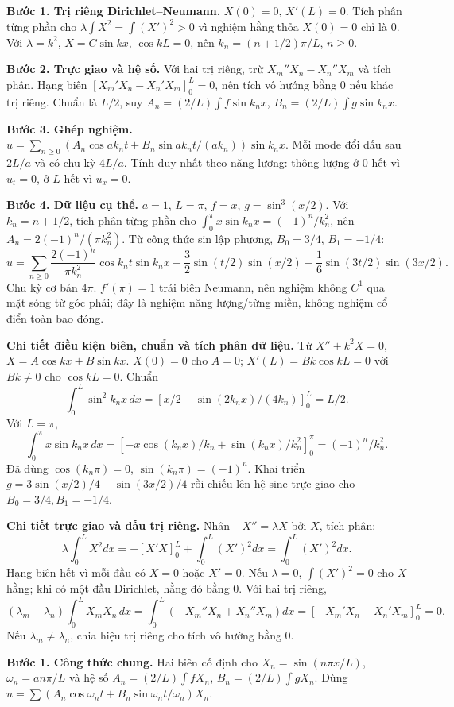 \textbf{Bước 1. Trị riêng Dirichlet–Neumann.} $X(0)=0$, $X'(L)=0$. Tích phân từng phần cho $\lambda\int X^2=\int(X')^2>0$ vì nghiệm hằng thỏa $X(0)=0$ chỉ là $0$. Với $\lambda=k^2$, $X=C\sin kx$, $\cos kL=0$, nên $k_n=(n+1/2)\pi/L$, $n\ge0$.

\textbf{Bước 2. Trực giao và hệ số.} Với hai trị riêng, trừ $X_m''X_n-X_n''X_m$ và tích phân. Hạng biên $[X_m'X_n-X_n'X_m]_0^L=0$, nên tích vô hướng bằng $0$ nếu khác trị riêng. Chuẩn là $L/2$, suy $A_n=(2/L)\int f\sin k_nx$, $B_n=(2/L)\int g\sin k_nx$.

\textbf{Bước 3. Ghép nghiệm.} $u=\sum_{n\ge0}(A_n\cos ak_nt+B_n\sin ak_nt/(ak_n))\sin k_nx$. Mỗi mode đổi dấu sau $2L/a$ và có chu kỳ $4L/a$. Tính duy nhất theo năng lượng: thông lượng ở $0$ hết vì $u_t=0$, ở $L$ hết vì $u_x=0$.

\textbf{Bước 4. Dữ liệu cụ thể.} $a=1$, $L=\pi$, $f=x$, $g=\sin^3(x/2)$. Với $k_n=n+1/2$, tích phân từng phần cho $\int_0^\pi x\sin k_nx=(-1)^n/k_n^2$, nên $A_n=2(-1)^n/(\pi k_n^2)$. Từ công thức sin lập phương, $B_0=3/4$, $B_1=-1/4$:
\[u=\sum_{n\ge0}\frac{2(-1)^n}{\pi k_n^2}\cos k_nt\sin k_nx
+\frac32\sin(t/2)\sin(x/2)-\frac16\sin(3t/2)\sin(3x/2).\]
Chu kỳ cơ bản $4\pi$. $f'(\pi)=1$ trái biên Neumann, nên nghiệm không $C^1$ qua mặt sóng từ góc phải; đây là nghiệm năng lượng/từng miền, không nghiệm cổ điển toàn bao đóng.

\textbf{Chi tiết điều kiện biên, chuẩn và tích phân dữ liệu.} Từ $X''+k^2X=0$, $X=A\cos kx+B\sin kx$. $X(0)=0$ cho $A=0$; $X'(L)=Bk\cos kL=0$ với $Bk\ne0$ cho $\cos kL=0$. Chuẩn
\[\int_0^L\sin^2k_nx\,dx=\left[x/2-\sin(2k_nx)/(4k_n)\right]_0^L=L/2.\]
Với $L=\pi$,
\[\int_0^\pi x\sin k_nx\,dx=
\left[-x\cos(k_nx)/k_n+\sin(k_nx)/k_n^2\right]_0^\pi
=(-1)^n/k_n^2.\]
Đã dùng $\cos(k_n\pi)=0$, $\sin(k_n\pi)=(-1)^n$. Khai triển $g=3\sin(x/2)/4-\sin(3x/2)/4$ rồi chiếu lên hệ sine trực giao cho $B_0=3/4,B_1=-1/4$.

\textbf{Chi tiết trực giao và dấu trị riêng.} Nhân $-X''=\lambda X$ bởi $X$, tích phân:
\[\lambda\int_0^LX^2dx=-[X'X]_0^L+\int_0^L(X')^2dx=\int_0^L(X')^2dx.\]
Hạng biên hết vì mỗi đầu có $X=0$ hoặc $X'=0$. Nếu $\lambda=0$, $\int(X')^2=0$ cho $X$ hằng; khi có một đầu Dirichlet, hằng đó bằng $0$. Với hai trị riêng,
\[(\lambda_m-\lambda_n)\int_0^LX_mX_n\,dx
=\int_0^L(-X_m''X_n+X_n''X_m)dx
=[-X_m'X_n+X_n'X_m]_0^L=0.\]
Nếu $\lambda_m\ne\lambda_n$, chia hiệu trị riêng cho tích vô hướng bằng $0$.

\textbf{Bước 1. Công thức chung.} Hai biên cố định cho $X_n=\sin(n\pi x/L)$, $\omega_n=an\pi/L$ và hệ số $A_n=(2/L)\int fX_n$, $B_n=(2/L)\int gX_n$. Dùng $u=\sum(A_n\cos\omega_nt+B_n\sin\omega_nt/\omega_n)X_n$.

